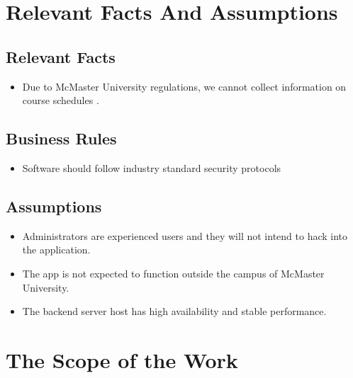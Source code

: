 \documentclass[12pt]{article}
\begin{document}
\section{Relevant Facts And Assumptions}
\subsection{Relevant Facts}
\begin{itemize}
  \item Due to McMaster University regulations, we cannot collect information on course schedules \cite{FIPPA}.
\end{itemize}

\subsection{Business Rules}
\begin{itemize}
  \item Software should follow industry standard security protocols
\end{itemize}

\subsection{Assumptions}
\begin{itemize}
 \item Administrators are experienced users and they will not intend to hack into the application.
  \item The app is not expected to function outside the campus of McMaster University.
  \item The backend server host has high availability and stable performance.
\end{itemize}

\section{The Scope of the Work}
\end{document}
